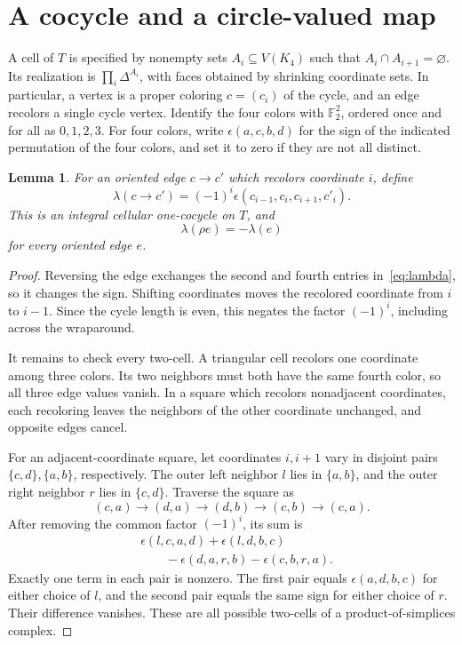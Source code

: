 \documentclass[11pt]{amsart}
\newtheorem{lemma}[theorem]{Lemma}
\theoremstyle{remark}
\numberwithin{equation}{section}
\newcommand{\F}{\mathbb F}
\begin{document}
\section{A cocycle and a circle-valued map}\label{sec:cocycle}

A cell of $T$ is specified by nonempty sets $A_i\subseteq V(K_4)$ such that $A_i\cap A_{i+1}=\varnothing$. Its realization is $\prod_i\Delta^{A_i}$, with faces obtained by shrinking coordinate sets. In particular, a vertex is a proper coloring $c=(c_i)$ of the cycle, and an edge recolors a single cycle vertex. Identify the four colors with $\F_2^2$, ordered once and for all as $0,1,2,3$. For four colors, write $\epsilon(a,c,b,d)$ for the sign of the indicated permutation of the four colors, and set it to zero if they are not all distinct.

\begin{lemma}\label{lem:cocycle}
For an oriented edge $c\to c'$ which recolors coordinate $i$, define
\begin{equation}\label{eq:lambda}
 \lambda(c\to c')=(-1)^i\epsilon(c_{i-1},c_i,c_{i+1},c'_i).
\end{equation}
This is an integral cellular one-cocycle on $T$, and
\[
 \lambda(\rho e)=-\lambda(e)
\]
for every oriented edge $e$.
\end{lemma}
\begin{proof}
Reversing the edge exchanges the second and fourth entries in~\eqref{eq:lambda}, so it changes the sign. Shifting coordinates moves the recolored coordinate from $i$ to $i-1$. Since the cycle length is even, this negates the factor $(-1)^i$, including across the wraparound.

It remains to check every two-cell. A triangular cell recolors one coordinate among three colors. Its two neighbors must both have the same fourth color, so all three edge values vanish. In a square which recolors nonadjacent coordinates, each recoloring leaves the neighbors of the other coordinate unchanged, and opposite edges cancel.

For an adjacent-coordinate square, let coordinates $i,i+1$ vary in disjoint pairs $\{c,d\},\{a,b\}$, respectively. The outer left neighbor $l$ lies in $\{a,b\}$, and the outer right neighbor $r$ lies in $\{c,d\}$. Traverse the square as
\[
 (c,a)\to(d,a)\to(d,b)\to(c,b)\to(c,a).
\]
After removing the common factor $(-1)^i$, its sum is
\begin{align*}
 &\epsilon(l,c,a,d)+\epsilon(l,d,b,c)\\
 &\hspace{2em}-\epsilon(d,a,r,b)-\epsilon(c,b,r,a).
\end{align*}
Exactly one term in each pair is nonzero. The first pair equals $\epsilon(a,d,b,c)$ for either choice of $l$, and the second pair equals the same sign for either choice of $r$. Their difference vanishes. These are all possible two-cells of a product-of-simplices complex.
\end{proof}
\end{document}
